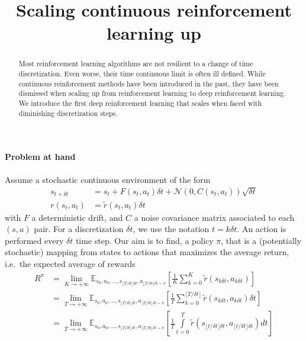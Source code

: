 \documentclass[11pt]{article}
\title{Scaling continuous reinforcement learning up}
\newcommand{\deltat}{{\delta t}}
\newcommand{\gauss}{\mathcal{N}}
\newcommand{\E}{\mathbb{E}}
\begin{document}
\maketitle
\begin{abstract}
	Most reinforcement learning algorithms are not resilient to a change of
	time discretization. Even worse, their time continuous limit is often
	ill defined.  While continuous reinforcement methods have been
	introduced in the past, they have been dismissed when scaling up from
	reinforcement learning to deep reinforcement learning. We introduce the
	first deep reinforcement learning that scales when faced with
	diminishing discretization steps.
\end{abstract}
\paragraph{Problem at hand}
Assume a stochastic continuous environment of the form
\begin{align}
	s_{t+\deltat} &= s_t + F(s_t, a_t) \deltat + \gauss(0, C(s_t, a_t)) \sqrt{\deltat}\\
	r(s_t, a_t) &= \tilde{r}(s_t, a_t) \deltat
\end{align}
with $F$ a deterministic drift, and $C$ a noise covariance matrix
associated to each $(s, a)$ pair. For a discretization $\deltat$, we use the notation $t = k \delta t$. An action is performed every $\deltat$ time step.
Our aim is to find, a policy $\pi$, that is a
(potentially stochastic) mapping from states to actions that maximizes the
average return, i.e.\ the expected average of rewards
\begin{align}
	R^\pi &= \lim\limits_{K\to+\infty}
	\E_{s_0, a_0, \ldots, s_{\lfloor T/\deltat\rfloor\deltat}, a_{\lfloor T/\deltat\rfloor\deltat\sim\pi}}\left[
		\frac{1}{K} \sum\limits_{k = 0}^K \tilde{r}(s_{k\deltat}, a_{k\deltat})
                \right] \\
              &= \lim\limits_{T\to+\infty}
	\E_{s_0, a_0, \ldots, s_{\lfloor T/\deltat\rfloor\deltat}, a_{\lfloor T/\deltat\rfloor\deltat\sim\pi}}\left[
		\frac{1}{T}\sum\limits_{k = 0}^{\lfloor T/\deltat\rfloor} \tilde{r}(s_{k\deltat}, a_{k\deltat})\deltat
                \right]\\
              &= \lim\limits_{T\to+\infty}	
	\E_{s_0, a_0, \ldots, s_{\lfloor T/\deltat\rfloor\deltat}, a_{\lfloor T/\deltat\rfloor\deltat\sim\pi}}\left[
		\frac{1}{T}\int\limits_{t = 0}^{T} \tilde{r}(s_{\lfloor t/\deltat\rfloor\deltat}, a_{\lfloor t/\deltat\rfloor\deltat})dt
	\right]
\end{align}
\end{document}
